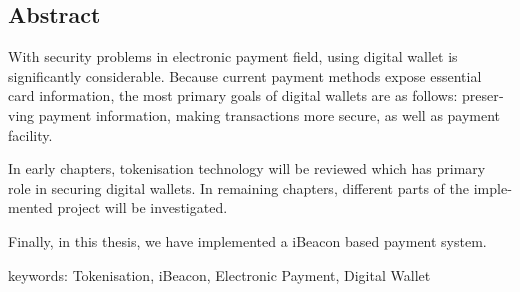 \documentclass[oneside]{report}
\begin{document}
	
	
	\newpage
	\def\bibname{مراجع}
	
	
	
	\newpage
	
	\begin{latin}
		
		\section*{Abstract}
		{
			\Large
			With security problems in electronic payment field, using digital wallet 
			is significantly considerable. Because current payment methods expose essential card information, the most primary goals of digital wallets are as follows:  preserving payment information, making transactions more secure, as well as payment facility. 
			
			\noindent
			In early chapters, tokenisation technology will be reviewed which has primary role in securing digital wallets. In remaining chapters, different parts of the implemented project will be investigated. 
			
			\noindent
			Finally, in this thesis, we have implemented a iBeacon based payment system.
			
			
			
			\vspace*{1.5cm}
			
			\noindent
			keywords: Tokenisation, iBeacon, Electronic Payment, Digital Wallet 
		}
		
		
	\end{latin}	
	
	\newpage
	
\end{document}
